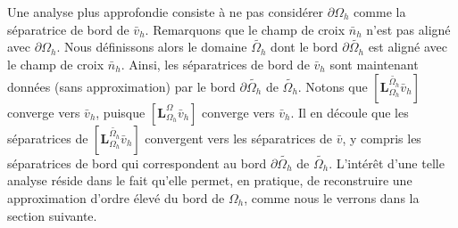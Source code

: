 Une analyse plus approfondie consiste à ne pas considérer $\partial\Omega_h$ comme la séparatrice de bord de $\bar{v}_h$. Remarquons que le champ de croix $\bar{n}_h$ n'est pas aligné avec $\partial\Omega_h$. Nous définissons alors le domaine $\widetilde{\Omega_h}$ dont le bord $\partial\widetilde{\Omega_h}$ est aligné avec le champ de croix $\bar{n}_h$. Ainsi, les séparatrices de bord de $\bar{v}_h$ sont maintenant données (sans approximation) par le bord $\partial\widetilde{\Omega_h}$ de $\widetilde{\Omega_h}$. Notons que $[\mathbf{L}_{\Omega_h}^{\widetilde{\Omega_h}}\bar{v}_h]$ converge vers $\bar{v}_h$, puisque $[\mathbf{L}_{\Omega_h}^{\Omega}\bar{v}_h]$ converge vers $\bar{v}_h$. Il en découle que les séparatrices de $[\mathbf{L}_{\Omega_h}^{\widetilde{\Omega_h}}\bar{v}_h]$ convergent vers les séparatrices de $\bar{v}$, y compris les séparatrices de bord qui correspondent au bord $\partial\widetilde{\Omega_h}$ de $\widetilde{\Omega_h}$. L'intérêt d'une telle analyse réside dans le fait qu'elle permet, en pratique, de reconstruire une approximation d'ordre élevé du bord de $\Omega_h$, comme nous le verrons dans la section suivante.


